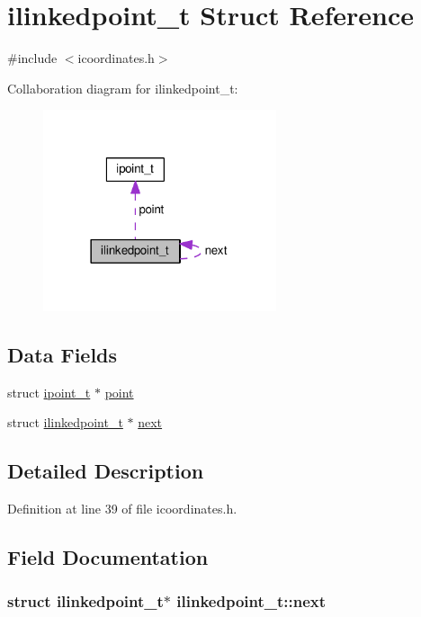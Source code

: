 \hypertarget{structilinkedpoint__t}{\section{ilinkedpoint\-\_\-t Struct Reference}
\label{structilinkedpoint__t}
}


{\ttfamily \#include $<$icoordinates.\-h$>$}



Collaboration diagram for ilinkedpoint\-\_\-t\-:\nopagebreak
\begin{figure}[H]
\begin{center}
\leavevmode
\includegraphics[width=194pt]{structilinkedpoint__t__coll__graph}
\end{center}
\end{figure}
\subsection*{Data Fields}
\begin{DoxyCompactItemize}
\item 
struct \hyperlink{structipoint__t}{ipoint\-\_\-t} $\ast$ \hyperlink{structilinkedpoint__t_ad679b26e2151ec3a4ad7b062679fd3c3}{point}
\item 
struct \hyperlink{structilinkedpoint__t}{ilinkedpoint\-\_\-t} $\ast$ \hyperlink{structilinkedpoint__t_a3af3bf37f168b5b11fce11262286d6c4}{next}
\end{DoxyCompactItemize}


\subsection{Detailed Description}


Definition at line 39 of file icoordinates.\-h.



\subsection{Field Documentation}
\hypertarget{structilinkedpoint__t_a3af3bf37f168b5b11fce11262286d6c4}{
\subsubsection[{next}]{\setlength{\rightskip}{0pt plus 5cm}struct {\bf ilinkedpoint\-\_\-t}$\ast$ ilinkedpoint\-\_\-t\-::next}}\label{structilinkedpoint__t_a3af3bf37f168b5b11fce11262286d6c4}


